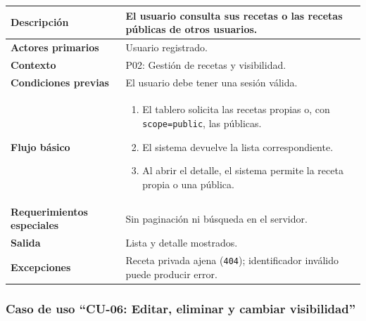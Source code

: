 \documentclass[doc,12pt,a4paper]{apa7}
\begin{document}
\begin{longtable}{|P{3.3cm}|L{11.2cm}|}
\hline
\textbf{Descripción} & El usuario consulta sus recetas o las recetas públicas de otros usuarios. \\ \hline
\textbf{Actores primarios} & Usuario registrado. \\ \hline
\textbf{Contexto} & P02: Gestión de recetas y visibilidad. \\ \hline
\textbf{Condiciones previas} & El usuario debe tener una sesión válida. \\ \hline
\textbf{Flujo básico} &
\begin{enumerate}
    \item El tablero solicita las recetas propias o, con \texttt{scope=public}, las públicas.
    \item El sistema devuelve la lista correspondiente.
    \item Al abrir el detalle, el sistema permite la receta propia o una pública.
\end{enumerate} \\ \hline
\textbf{Requerimientos especiales} & Sin paginación ni búsqueda en el servidor. \\ \hline
\textbf{Salida} & Lista y detalle mostrados. \\ \hline
\textbf{Excepciones} & Receta privada ajena (\texttt{404}); identificador inválido puede producir error. \\ \hline
\end{longtable}

\subsubsection{Caso de uso ``CU-06: Editar, eliminar y cambiar visibilidad''}
\end{document}
